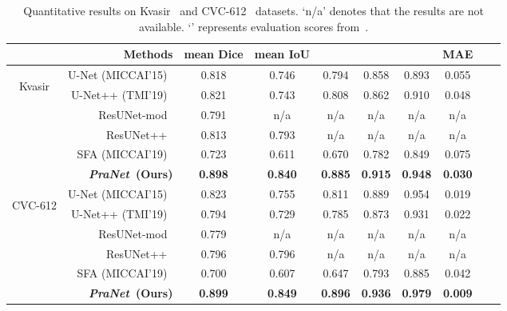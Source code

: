 \documentclass[runningheads]{llncs}
\def\ourmodel{\textit{PraNet}}
\begin{document}
\begin{table*}[t!]
  \centering
  \scriptsize
  \renewcommand{\arraystretch}{1.1}
  \setlength\tabcolsep{5pt}
  \caption{Quantitative results on Kvasir~\cite{jha2020kvasir} and  CVC-612~\cite{bernal2015wm} datasets.
  `n/a' denotes that the results are not available. `' represents evaluation scores from~\cite{jha2019resunetplus}.
}\label{tab:Kvasir-CVC612}
  \begin{tabular}{cr||cccccccc}
  \hline
\rowcolor{mygray}
   &Methods & mean Dice & mean IoU  &   & & & MAE\\
  \hline
\multirow{6}{*}{\begin{sideways}Kvasir\end{sideways}} & 
U-Net (MICCAI'15)~\cite{ronneberger2015u} & 0.818 & 0.746 & 0.794 & 0.858 & 0.893 & 0.055 \\
  &U-Net++ (TMI'19)~\cite{zhou2018unetplus} & 0.821  & 0.743 & 0.808 & 0.862 & 0.910 & 0.048 \\
& ResUNet-mod~\cite{zhang2018road} & 0.791 &  n/a  & n/a & n/a & n/a & n/a \\
  & ResUNet++~\cite{jha2019resunetplus} & 0.813 & 0.793 & n/a & n/a & n/a & n/a\\
  & SFA (MICCAI'19)~\cite{fang2019selective} & 0.723 & 0.611 & 0.670 & 0.782 & 0.849 & 0.075\\
  & \textbf{\ourmodel~(Ours)} & \textbf{0.898} & \textbf{0.840} & \textbf{0.885} & \textbf{0.915} & \textbf{0.948} & \textbf{0.030}\\
\hline
  \hline
  \multirow{6}{*}{\begin{sideways}CVC-612\end{sideways}} & 
U-Net (MICCAI'15)~\cite{ronneberger2015u} & 0.823 & 0.755 & 0.811 & 0.889 & 0.954 & 0.019 \\
  &U-Net++ (TMI'19)~\cite{zhou2018unetplus} & 0.794  & 0.729 & 0.785 & 0.873 & 0.931 & 0.022\\
  &ResUNet-mod~\cite{zhang2018road} & 0.779 & n/a & n/a & n/a & n/a & n/a \\
  &ResUNet++~\cite{jha2019resunetplus} & 0.796  & 0.796 & n/a & n/a & n/a & n/a\\
  &SFA (MICCAI'19)~\cite{fang2019selective} & 0.700 & 0.607 & 0.647 & 0.793 & 0.885 & 0.042\\
  &\textbf{\ourmodel~(Ours)} & \textbf{0.899} & \textbf{0.849} & \textbf{0.896} & \textbf{0.936} & \textbf{0.979}  & \textbf{0.009}\\
  \hline
  \end{tabular}
\end{table*}
\end{document}
